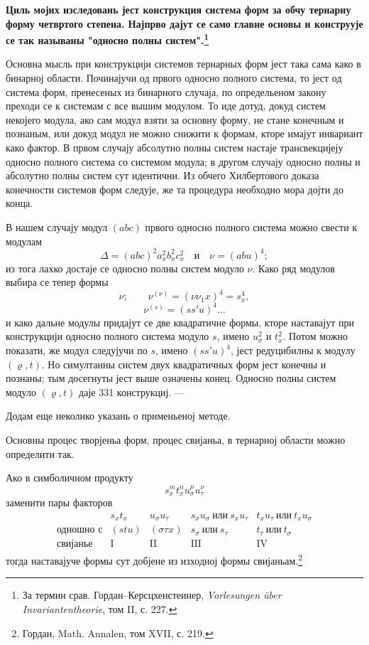 ﻿\documentclass[11pt]{article}
\begin{document}
\textbf{Циль мојих изследовань јест конструкция система форм за обчу тернарну форму четвртого степена. Најпрво дајут се само главне основы и конструује се так называны "односно полны систем".\footnote{За термин срав. Гордан--Керсцхенстеинер, \emph{Vorlesungen über Invariantentheorie}, том II, с. 227.}}

Основна мысль при конструкцији системов тернарных форм јест така сама како в бинарној области. Починајучи од првого односно полного система, то јест од система форм, пренесеных из бинарного случаја, по определьеном закону преходи се к системам с все вышим модулом. То иде дотуд, докуд систем некојего модула, ако сам модул взяти за основну форму, не стане конечным и познаным, или докуд модул не можно снижити к формам, кторе имајут инвариант како фактор. В првом случају абсолутно полны систем настаје трансвекцијеју односно полного система со системом модула; в другом случају односно полны и абсолутно полны систем сут идентични. Из обчего Хилбертового доказа конечности системов форм следује, же та процедура необходно мора дојти до конца.

В нашем случају модул $(abc)$ првого односно полного система можно свести к модулам
\[
\Delta=(abc)^2a_x^2b_x^2c_x^2\quad\text{и}\quad \nu=(abu)^4;
\]
из тога лахко достаје се односно полны систем модуло $\nu$. Како ряд модулов выбира се тепер формы
\[
\nu;\qquad \nu^{(\nu)}=(\nu\nu_1x)^4=s_x^4,
\]
\[
\nu^{(s)}=(ss'u)^4\ldots
\]
и како дальне модулы придајут се две квадратичне формы, кторе наставајут при конструкцији односно полного система модуло $s$, имено $u_\sigma^2$ и $t_x^2$. Потом можно показати, же модул следујучи по $s$, имено $(ss'u)^4$, јест редуцибилны к модулу $(\varrho,t)$. Но симултанны систем двух квадратичных форм јест конечны и познаны; тым досегнуты јест выше означены конец. Односно полны систем модуло $(\varrho,t)$ даје 331 конструкциј. ---

Додам еще неколико указань о применьеној методе.

Основны процес творјеньа форм, процес свијаньа, в тернарној области можно определити так.

Ако в симболичном продукту
\[
s_x^m t_x^n u_\sigma^\mu u_\tau^\nu
\]
заменити пары факторов
\[
\begin{array}{c|c|c|c|c}
 & s_xt_x & u_\sigma u_\tau & s_xu_\sigma\ \text{или}\ s_xu_\tau & t_xu_\tau\ \text{или}\ t_xu_\sigma\\
\text{одношно с} & (stu) & (\sigma\tau x) & s_\sigma\ \text{или}\ s_\tau & t_\tau\ \text{или}\ t_\sigma\\
\text{свијанье} & \mathrm{I} & \mathrm{II} & \mathrm{III} & \mathrm{IV}
\end{array}
\]
тогда наставајуче формы сут добјене из изходној формы свијаньам.\footnote{Гордан, Math. Annalen, том XVII, с. 219.}
\end{document}
